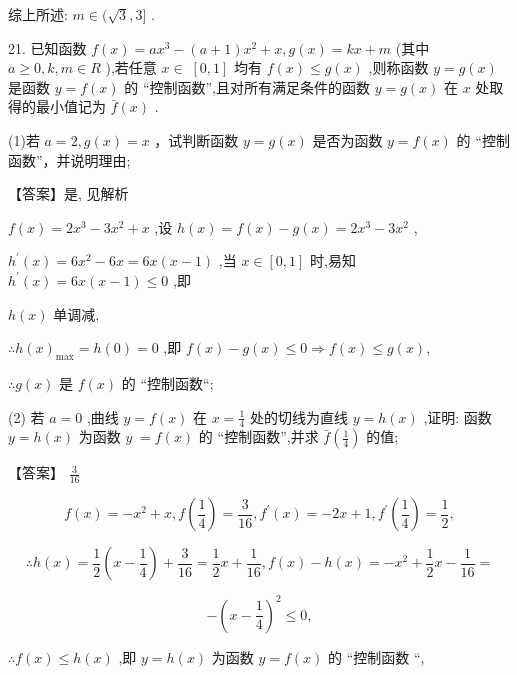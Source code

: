 \documentclass[10pt]{article}
\begin{document}
综上所述: \(m \in  (\sqrt{3},3\rbrack\) .

21. 已知函数 \(f\left( x\right)  = a{x}^{3} - \left( {a + 1}\right) {x}^{2} + x,g\left( x\right)  = {kx} + m\) (其中 \(a \geq  0,k,m \in  R\) ),若任意 \(x \in \; \left\lbrack  {0,1}\right\rbrack\) 均有 \(f\left( x\right)  \leq  g\left( x\right)\) ,则称函数 \(y = g\left( x\right)\) 是函数 \(y = f\left( x\right)\) 的 “控制函数”,且对所有满足条件的函数 \(y = g\left( x\right)\) 在 \(x\) 处取得的最小值记为 \(\bar{f}\left( x\right)\) .

(1)若 \(a = 2,g\left( x\right)  = x\) ，试判断函数 \(y = g\left( x\right)\) 是否为函数 \(y = f\left( x\right)\) 的 “控制函数”，并说明理由;

【答案】是, 见解析

\(f\left( x\right)  = 2{x}^{3} - 3{x}^{2} + x\) ,设 \(h\left( x\right)  = f\left( x\right)  - g\left( x\right)  = 2{x}^{3} - 3{x}^{2}\) ,

\({h}^{\prime }\left( x\right)  = 6{x}^{2} - {6x} = {6x}\left( {x - 1}\right)\) ,当 \(x \in  \left\lbrack  {0,1}\right\rbrack\) 时,易知 \({h}^{\prime }\left( x\right)  = {6x}\left( {x - 1}\right)  \leq  0\) ,即

\(h\left( x\right)\) 单调减,

\(\therefore h{\left( x\right) }_{\max } = h\left( 0\right)  = 0\) ,即 \(f\left( x\right)  - g\left( x\right)  \leq  0 \Rightarrow  f\left( x\right)  \leq  g\left( x\right) ,\)

\(\therefore g\left( x\right)\) 是 \(f\left( x\right)\) 的 “控制函数“;

(2) 若 \(a = 0\) ,曲线 \(y = f\left( x\right)\) 在 \(x = \frac{1}{4}\) 处的切线为直线 \(y = h\left( x\right)\) ,证明: 函数 \(y = h\left( x\right)\) 为函数 \(y \; = f\left( x\right)\) 的 “控制函数”,并求 \(\bar{f}\left( \frac{1}{4}\right)\) 的值;

【答案】 \(\frac{3}{16}\)

\[
f\left( x\right)  =  - {x}^{2} + x,f\left( \frac{1}{4}\right)  = \frac{3}{16},{f}^{\prime }\left( x\right)  =  - {2x} + 1,{f}^{\prime }\left( \frac{1}{4}\right)  = \frac{1}{2},
\]

\[
\therefore h\left( x\right)  = \frac{1}{2}\left( {x - \frac{1}{4}}\right)  + \frac{3}{16} = \frac{1}{2}x + \frac{1}{16},f\left( x\right)  - h\left( x\right)  =  - {x}^{2} + \frac{1}{2}x - \frac{1}{16} =
\]

\[
- {\left( x - \frac{1}{4}\right) }^{2} \leq  0,
\]

\(\therefore f\left( x\right)  \leq  h\left( x\right)\) ,即 \(y = h\left( x\right)\) 为函数 \(y = f\left( x\right)\) 的 “控制函数 “,
\end{document}
